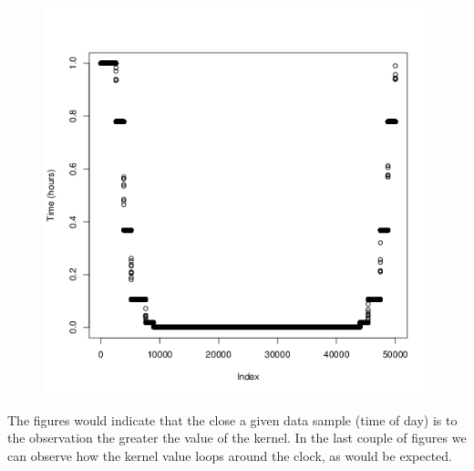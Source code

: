 \documentclass[a4paper, twocolumn]{article}
\begin{document}
\begin{figure}[H]
\begin{minipage}[]{0.2\textwidth}
	    \end{minipage}
	    \begin{minipage}[]{0.4\textwidth}
	    	\includegraphics[width=\textwidth]{share/11_time.png}
	    \end{minipage}
    \end{figure}
	The figures would indicate that the close a given data sample (time of day) is to the observation the greater the value of the kernel. In the last couple of figures we can observe how the kernel value loops around the clock, as would be expected.
\end{document}
